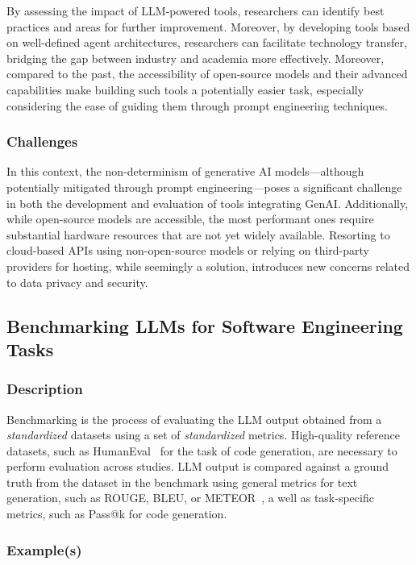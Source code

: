 By assessing the impact of LLM-powered tools, researchers can identify best practices and areas for further improvement.
Moreover, by developing tools based on well-defined agent architectures, researchers can facilitate technology transfer, bridging the gap between industry and academia more effectively. Moreover, compared to the past, the accessibility of open-source models and their advanced capabilities make building such tools a potentially easier task, especially considering the ease of guiding them through prompt engineering techniques.

\subsubsection{Challenges}


In this context, the non-determinism of generative AI models—although potentially mitigated through prompt engineering—poses a significant challenge in both the development and evaluation of tools integrating GenAI. 
Additionally, while open-source models are accessible, the most performant ones require substantial hardware resources that are not yet widely available. Resorting to cloud-based APIs using non-open-source models or relying on third-party providers for hosting, while seemingly a solution, introduces new concerns related to data privacy and security.


\subsection{Benchmarking LLMs for Software Engineering Tasks}

\subsubsection{Description}

Benchmarking is the process of evaluating the LLM output obtained from a \emph{standardized} datasets using a set of \emph{standardized} metrics.
High-quality reference datasets, such as HumanEval~\cite{DBLP:journals/corr/abs-2107-03374} for the task of code generation, are necessary to perform evaluation across studies.
LLM output is compared against a ground truth from the dataset in the benchmark using general metrics for text generation, such as ROUGE, BLEU, or METEOR~\cite{10.1145/3695988}, a well as task-specific metrics, such as Pass@k for code generation.

\subsubsection{Example(s)}

